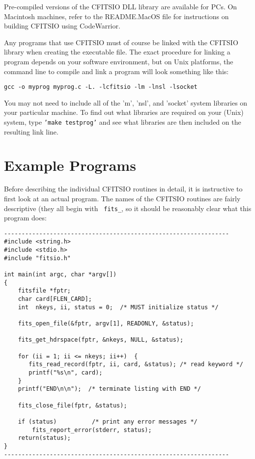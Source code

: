 \documentclass[11pt]{article}
\begin{document}
Pre-compiled versions of the CFITSIO DLL library are available for
PCs.  On Macintosh machines, refer to the README.MacOS file for
instructions on building CFITSIO using CodeWarrior.

Any programs that use CFITSIO must of course be linked with the CFITSIO
library when creating the executable file.  The exact procedure for
linking a program depends on your software environment, but on Unix
platforms, the command line to compile and link a program will look
something like this:

\begin{verbatim}
gcc -o myprog myprog.c -L. -lcfitsio -lm -lnsl -lsocket
\end{verbatim}

You may not need to include all of the 'm', 'nsl', and 'socket' system
libraries on your particular machine.  To find out what libraries are
required on your (Unix) system, type {\tt'make testprog'} and see what
libraries are then included on the resulting link line.

\newpage
\section{Example Programs}

Before describing the individual CFITSIO routines in detail, it is
instructive to first look at an actual program.  The names of the
CFITSIO routines are fairly descriptive (they all begin with {\tt
fits\_}, so it should be reasonably clear what this program does:

\begin{verbatim}
----------------------------------------------------------------
#include <string.h>
#include <stdio.h>
#include "fitsio.h"

int main(int argc, char *argv[])
{
    fitsfile *fptr;         
    char card[FLEN_CARD]; 
    int  nkeys, ii, status = 0;  /* MUST initialize status */

    fits_open_file(&fptr, argv[1], READONLY, &status);

    fits_get_hdrspace(fptr, &nkeys, NULL, &status);

    for (ii = 1; ii <= nkeys; ii++)  { 
       fits_read_record(fptr, ii, card, &status); /* read keyword */
       printf("%s\n", card);
    }
    printf("END\n\n");  /* terminate listing with END */

    fits_close_file(fptr, &status);

    if (status)          /* print any error messages */
        fits_report_error(stderr, status);
    return(status);
}
----------------------------------------------------------------
\end{verbatim}
\end{document}
